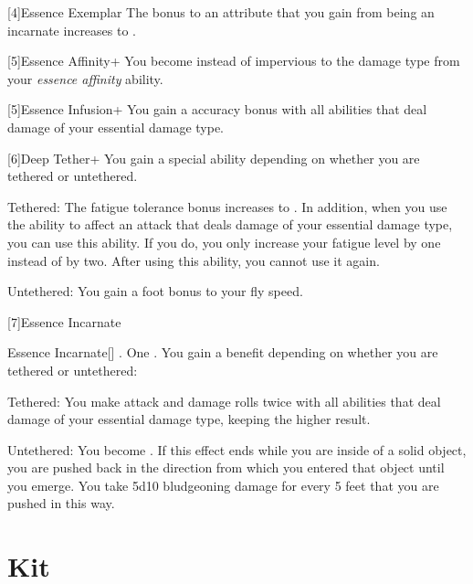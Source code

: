 [4]{Essence Exemplar} The bonus to an attribute that you gain from being an incarnate increases to .

[5]{Essence Affinity+} You become  instead of impervious to the damage type from your \textit{essence affinity} ability.

[5]{Essence Infusion+} You gain a  accuracy bonus with all abilities that deal damage of your essential damage type.

[6]{Deep Tether+} You gain a special ability depending on whether you are tethered or untethered.
\begin{raggeditemize}
	\item Tethered: The fatigue tolerance bonus increases to .
	In addition, when you use the  ability to affect an attack that deals damage of your essential damage type, you can use this ability.
	If you do, you only increase your fatigue level by one instead of by two.
	After using this ability, you  cannot use it again.
	\item Untethered: You gain a  foot bonus to your fly speed.
\end{raggeditemize}

[7]{Essence Incarnate}
\begin{magicalactiveability}{Essence Incarnate}[]
	\abilityusagetime {}.
	\abilitycost One .
	\rankline
	You gain a benefit depending on whether you are tethered or untethered:
	\begin{raggeditemize}
		\item Tethered: You  make attack and damage rolls twice with all abilities that deal damage of your essential damage type, keeping the higher result.
		\item Untethered: You  become .
		If this effect ends while you are inside of a solid object, you are pushed back in the direction from which you entered that object until you emerge.
		You take 5d10 bludgeoning damage for every 5 feet that you are pushed in this way.
	\end{raggeditemize}

	{}
\end{magicalactiveability}

\section{Kit}

